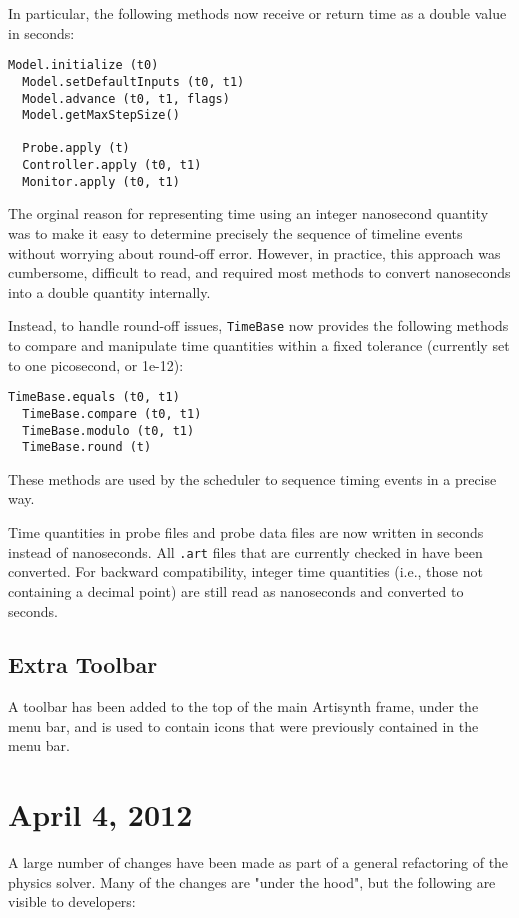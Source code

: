 \documentclass{article}
\begin{document}
In particular, the following methods now receive or return time as a
double value in seconds:
\begin{lstlisting}[]
  Model.initialize (t0)
  Model.setDefaultInputs (t0, t1)
  Model.advance (t0, t1, flags)
  Model.getMaxStepSize()

  Probe.apply (t)
  Controller.apply (t0, t1)
  Monitor.apply (t0, t1)
\end{lstlisting}

The orginal reason for representing time using an integer nanosecond
quantity was to make it easy to determine precisely the sequence of
timeline events without worrying about round-off error. However, in
practice, this approach was cumbersome, difficult to read, and
required most methods to convert nanoseconds into a double quantity
internally.

Instead, to handle round-off issues, {\tt TimeBase} now provides the
following methods to compare and manipulate time quantities within a
fixed tolerance (currently set to one picosecond, or 1e-12):
\begin{lstlisting}[]
  TimeBase.equals (t0, t1)
  TimeBase.compare (t0, t1)
  TimeBase.modulo (t0, t1)
  TimeBase.round (t)
\end{lstlisting}
These methods are used by the scheduler to sequence timing events in a
precise way.

Time quantities in probe files and probe data files are now written in
seconds instead of nanoseconds. All {\tt .art} files that are currently
checked in have been converted. For backward compatibility, integer
time quantities (i.e., those not containing a decimal point) are still
read as nanoseconds and converted to seconds.

\subsection*{Extra Toolbar}

A toolbar has been added to the top of the main Artisynth frame, under
the menu bar, and is used to contain icons that were previously
contained in the menu bar. 

\section*{April 4, 2012}

A large number of changes have been made as part of a general
refactoring of the physics solver. Many of the changes are "under the
hood", but the following are visible to developers:
\end{document}
